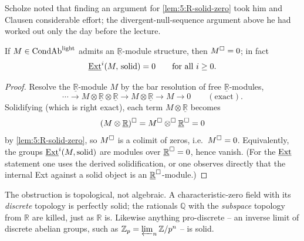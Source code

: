 \begin{remark}
\label{rmk:5:R-argument-history}
Scholze noted that finding an argument for \cref{lem:5:R-solid-zero} took him and
Clausen considerable effort; the divergent-null-sequence argument above he had
worked out only the day before the lecture.
\end{remark}

\begin{corollary}
\label{cor:5:R-modules-killed}
If $M\in\mathrm{CondAb}^{\mathrm{light}}$ admits an $\underline{\mathbb{R}}$-module structure, then
$M^{\square}=0$; in fact
\begin{equation*}
\underline{\operatorname{Ext}}^{i}(M,\,\text{solid})=0\qquad\text{for all }i\ge0 .
\end{equation*}
\end{corollary}

\begin{proof}
Resolve the $\underline{\mathbb{R}}$-module $M$ by the bar resolution of free
$\underline{\mathbb{R}}$-modules,
\begin{equation*}
\cdots\longrightarrow M\otimes\underline{\mathbb{R}}\otimes\underline{\mathbb{R}}
\longrightarrow M\otimes\underline{\mathbb{R}}\longrightarrow M\longrightarrow0
\qquad(\text{exact}).
\end{equation*}
Solidifying (which is right exact), each term $M\otimes\underline{\mathbb{R}}$
becomes
\[
(M\otimes\underline{\mathbb{R}})^{\square}
=M^{\square}\otimes^{\square}\underline{\mathbb{R}}^{\square}=0
\]
by \cref{lem:5:R-solid-zero}, so $M^{\square}$ is a colimit of zeros, i.e.\
$M^{\square}=0$. Equivalently, the groups $\underline{\operatorname{Ext}}^{i}(M,\text{solid})$ are modules
over $\underline{\mathbb{R}}^{\square}=0$, hence vanish. (For the $\underline{\operatorname{Ext}}$ statement
one uses the derived solidification, or one observes directly that the internal
Ext against a solid object is an $\underline{\mathbb{R}}^{\square}$-module.)
\end{proof}

\begin{remark}
\label{rmk:5:topology-not-field}
The obstruction is topological, not algebraic. A characteristic-zero field with
its \emph{discrete} topology is perfectly solid; the rationals $\mathbb{Q}$ with
the \emph{subspace} topology from $\mathbb{R}$ are killed, just as $\mathbb{R}$
is. Likewise anything pro-discrete -- an inverse limit of discrete abelian
groups, such as $\mathbb{Z}_p=\varprojlim_n\mathbb{Z}/p^n$ -- is solid.
\end{remark}

